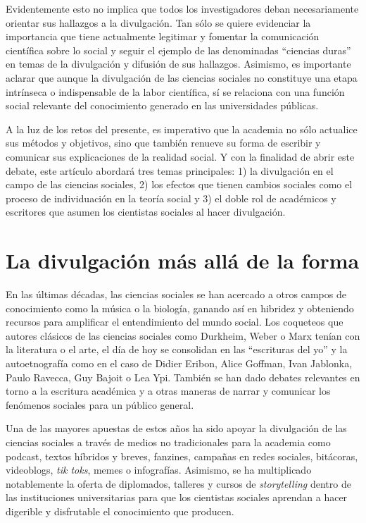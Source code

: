 \documentclass[
  spanish,
  11pt,
  a4paper,
]{scrbook}
\begin{document}
Evidentemente esto no implica que todos los investigadores deban
necesariamente orientar sus hallazgos a la divulgación. Tan sólo se
quiere evidenciar la importancia que tiene actualmente legitimar y
fomentar la comunicación científica sobre lo social y seguir el ejemplo
de las denominadas ``ciencias duras'' en temas de la divulgación y
difusión de sus hallazgos. Asimismo, es importante aclarar que aunque la
divulgación de las ciencias sociales no constituye una etapa intrínseca
o indispensable de la labor científica, sí se relaciona con una función
social relevante del conocimiento generado en las universidades
públicas.

A la luz de los retos del presente, es imperativo que la academia no
sólo actualice sus métodos y objetivos, sino que también renueve su
forma de escribir y comunicar sus explicaciones de la realidad social. Y
con la finalidad de abrir este debate, este artículo abordará tres temas
principales: 1) la divulgación en el campo de las ciencias sociales, 2)
los efectos que tienen cambios sociales como el proceso de individuación
en la teoría social y 3) el doble rol de académicos y escritores que
asumen los cientistas sociales al hacer divulgación.

\section*{La divulgación más allá de la
forma}\label{la-divulgaciuxf3n-muxe1s-alluxe1-de-la-forma}


En las últimas décadas, las ciencias sociales se han acercado a otros
campos de conocimiento como la música o la biología, ganando así en
hibridez y obteniendo recursos para amplificar el entendimiento del
mundo social. Los coqueteos que autores clásicos de las ciencias
sociales como Durkheim, Weber o Marx tenían con la literatura o el arte,
el día de hoy se consolidan en las ``escrituras del yo'' y la
autoetnografía como en el caso de Didier Eribon, Alice Goffman, Ivan
Jablonka, Paulo Ravecca, Guy Bajoit o Lea Ypi. También se han dado
debates relevantes en torno a la escritura académica y a otras maneras
de narrar y comunicar los fenómenos sociales para un público general.

Una de las mayores apuestas de estos años ha sido apoyar la divulgación
de las ciencias sociales a través de medios no tradicionales para la
academia como podcast, textos híbridos y breves, fanzines, campañas en
redes sociales, bitácoras, videoblogs, \emph{tik toks}, memes o
infografías. Asimismo, se ha multiplicado notablemente la oferta de
diplomados, talleres y cursos de \emph{storytelling} dentro de las
instituciones universitarias para que los cientistas sociales aprendan a
hacer digerible y disfrutable el conocimiento que producen.
\end{document}

